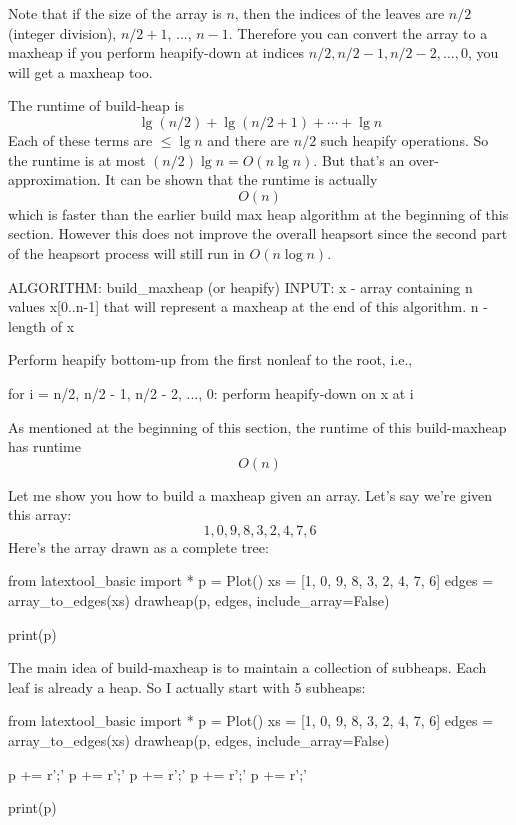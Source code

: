 Note that if the size of the array is $n$,
then the indices of the leaves are
$n/2$ (integer division), $n/2 + 1$, ..., $n - 1$.
Therefore you can convert the array to a maxheap
if you perform heapify-down at indices
$n/2, n/2-1, n/2-2,...,0$, you will get a maxheap too.

The runtime of build-heap is
\[
  \lg (n/2) + \lg (n/2 + 1) + \cdots + \lg n
\]
Each of these terms are $\leq \lg n$ and there are $n/2$
such heapify operations.
So the runtime is at most $(n/2) \lg n = O(n \lg n)$.
But that's an over-approximation.
It can be shown that the runtime is actually
\[
O(n)
\]
which is faster than the earlier build max heap algorithm
at the beginning of this section.
However this does not improve the overall heapsort
since the second part of the heapsort process will still run
in $O(n \log n)$.

\begin{console}
ALGORITHM: build_maxheap (or heapify)
INPUT: x - array containing n values x[0..n-1] that will
           represent a maxheap at the end of this
           algorithm.
       n - length of x

Perform heapify bottom-up from the first nonleaf to the
root, i.e.,

for i = n/2, n/2 - 1, n/2 - 2, ..., 0:
    perform heapify-down on x at i
\end{console}

As mentioned at the beginning of this section, the runtime of
this build-maxheap has runtime
\[
O(n)
\]

Let me show you how to 
build a maxheap given an array.
Let's say we're given this array:
\[
1, 0, 9, 8, 3, 2, 4, 7, 6
\]
Here's the array drawn as a complete tree:

\begin{python}
from latextool_basic import *
p = Plot()
xs = [1, 0, 9, 8, 3, 2, 4, 7, 6]
edges = array_to_edges(xs)
drawheap(p, edges, include_array=False)

print(p)
\end{python}

The main idea of build-maxheap
is to maintain a collection of subheaps.
Each leaf is already a heap.
So I actually start with 5 subheaps:

\begin{python}
from latextool_basic import *
p = Plot()
xs = [1, 0, 9, 8, 3, 2, 4, 7, 6]
edges = array_to_edges(xs)
drawheap(p, edges, include_array=False)

p += r'\node [ellipse, draw=red, fit=(3), line width=0.1cm, inner sep=0.0cm] {};'
p += r'\node [ellipse, draw=red, fit=(2), line width=0.1cm, inner sep=0.0cm] {};'
p += r'\node [ellipse, draw=red, fit=(4), line width=0.1cm, inner sep=0.0cm] {};'
p += r'\node [ellipse, draw=red, fit=(7), line width=0.1cm, inner sep=0.0cm] {};'
p += r'\node [ellipse, draw=red, fit=(6), line width=0.1cm, inner sep=0.0cm] {};'

print(p)
\end{python}

